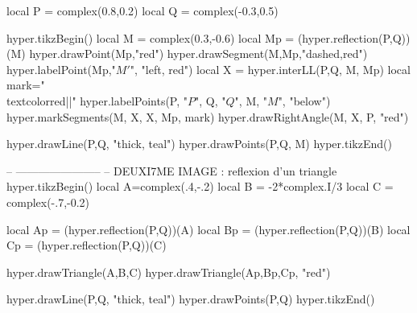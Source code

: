 \documentclass[margin=.2cm,multi,tikz]{standalone}
\begin{document}
\begin{luacode*}
local P = complex(0.8,0.2)
local Q = complex(-0.3,0.5)



hyper.tikzBegin()
local M = complex(0.3,-0.6)
local Mp = (hyper.reflection(P,Q))(M)
hyper.drawPoint(Mp,"red")
hyper.drawSegment(M,Mp,"dashed,red")
hyper.labelPoint(Mp,"$M'$", "left, red")
local X = hyper.interLL(P,Q, M, Mp)
local mark="\\textcolor{red}{||}"
hyper.labelPoints(P, "$P$", Q, "$Q$", M, "$M$", "below")
hyper.markSegments(M, X, X, Mp, mark)
hyper.drawRightAngle(M, X, P, "red")

hyper.drawLine(P,Q, "thick, teal")
hyper.drawPoints(P,Q, M)
hyper.tikzEnd()

-- -----------------------
-- DEUXI7ME IMAGE : reflexion d'un triangle
hyper.tikzBegin()
local A=complex(.4,-.2)
local B = -2*complex.I/3
local C = complex(-.7,-0.2)

local Ap = (hyper.reflection(P,Q))(A)
local Bp = (hyper.reflection(P,Q))(B)
local Cp = (hyper.reflection(P,Q))(C)

hyper.drawTriangle(A,B,C)
hyper.drawTriangle(Ap,Bp,Cp, "red")

hyper.drawLine(P,Q, "thick, teal")
hyper.drawPoints(P,Q)
hyper.tikzEnd()
\end{luacode*}
\end{document}
